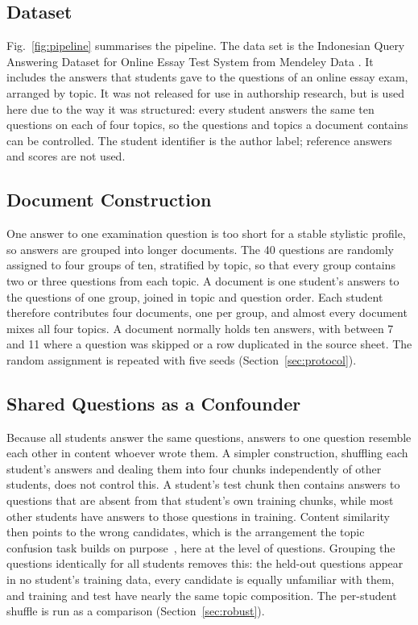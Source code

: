 \documentclass[runningheads]{llncs}
\begin{document}
\subsection{Dataset}

Fig.~\ref{fig:pipeline} summarises the pipeline. The data set is the Indonesian Query Answering Dataset for Online Essay Test System from Mendeley Data \cite{Rahutomo2018}. It includes the answers that students gave to the questions of an online essay exam, arranged by topic. It was not released for use in authorship research, but is used here due to the way it was structured: every student answers the same ten questions on each of four topics, so the questions and topics a document contains can be controlled. The student identifier is the author label; reference answers and scores are not used.

\subsection{Document Construction}
\label{sec:corpus}

One answer to one examination question is too short for a stable stylistic profile, so answers are grouped into longer documents. The 40 questions are randomly assigned to four groups of ten, stratified by topic, so that every group contains two or three questions from each topic. A document is one student's answers to the questions of one group, joined in topic and question order. Each student therefore contributes four documents, one per group, and almost every document mixes all four topics. A document normally holds ten answers, with between 7 and 11 where a question was skipped or a row duplicated in the source sheet. The random assignment is repeated with five seeds (Section~\ref{sec:protocol}).

\subsection{Shared Questions as a Confounder}
\label{sec:confound}

Because all students answer the same questions, answers to one question resemble each other in content whoever wrote them. A simpler construction, shuffling each student's answers and dealing them into four chunks independently of other students, does not control this. A student's test chunk then contains answers to questions that are absent from that student's own training chunks, while most other students have answers to those questions in training. Content similarity then points to the wrong candidates, which is the arrangement the topic confusion task builds on purpose~\cite{Altakrori2021}, here at the level of questions. Grouping the questions identically for all students removes this: the held-out questions appear in no student's training data, every candidate is equally unfamiliar with them, and training and test have nearly the same topic composition. The per-student shuffle is run as a comparison (Section~\ref{sec:robust}).
\end{document}
